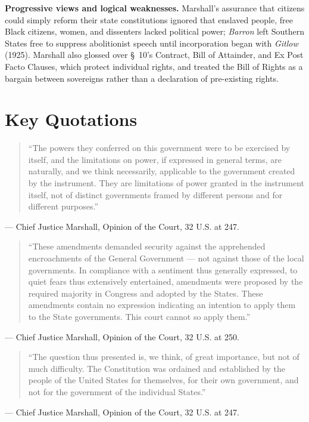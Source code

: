 \documentclass[12pt]{article}
\begin{document}
\textbf{Progressive views and logical weaknesses.} Marshall's assurance that citizens could simply reform their state constitutions ignored that enslaved people, free Black citizens, women, and dissenters lacked political power; \textit{Barron} left Southern States free to suppress abolitionist speech until incorporation began with \textit{Gitlow} (1925). Marshall also glossed over \S~10's Contract, Bill of Attainder, and Ex Post Facto Clauses, which protect individual rights, and treated the Bill of Rights as a bargain between sovereigns rather than a declaration of pre-existing rights.

\section{Key Quotations}

\begin{quote}
``The powers they conferred on this government were to be exercised by itself, and the limitations on power, if expressed in general terms, are naturally, and we think necessarily, applicable to the government created by the instrument. They are limitations of power granted in the instrument itself, not of distinct governments framed by different persons and for different purposes.''
\end{quote}
\noindent --- Chief Justice Marshall, Opinion of the Court, 32 U.S. at 247.

\begin{quote}
``These amendments demanded security against the apprehended encroachments of the General Government --- not against those of the local governments. In compliance with a sentiment thus generally expressed, to quiet fears thus extensively entertained, amendments were proposed by the required majority in Congress and adopted by the States. These amendments contain no expression indicating an intention to apply them to the State governments. This court cannot so apply them.''
\end{quote}
\noindent --- Chief Justice Marshall, Opinion of the Court, 32 U.S. at 250.

\begin{quote}
``The question thus presented is, we think, of great importance, but not of much difficulty. The Constitution was ordained and established by the people of the United States for themselves, for their own government, and not for the government of the individual States.''
\end{quote}
\noindent --- Chief Justice Marshall, Opinion of the Court, 32 U.S. at 247.
\end{document}
